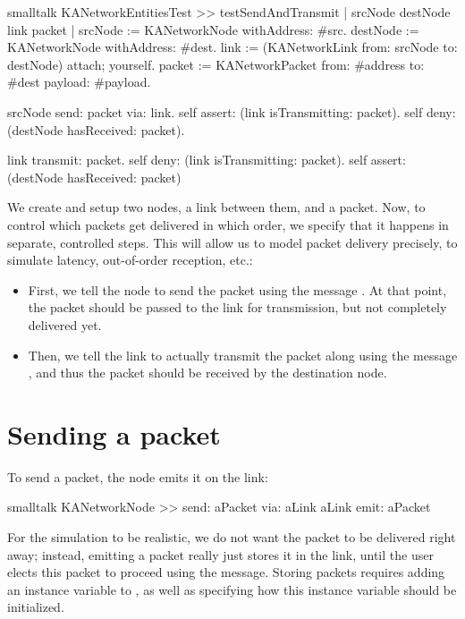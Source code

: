 \documentclass[10pt,twoside,english]{_support/latex/sbabook/sbabook}
\begin{document}
\begin{displaycode}{smalltalk}
KANetworkEntitiesTest >> testSendAndTransmit
    | srcNode destNode link packet |
    srcNode := KANetworkNode withAddress: #src.
    destNode := KANetworkNode withAddress: #dest.
    link := (KANetworkLink from: srcNode to: destNode) attach; yourself.
    packet := KANetworkPacket from: #address to: #dest payload: #payload.

    srcNode send: packet via: link.
    self assert: (link isTransmitting: packet).
    self deny: (destNode hasReceived: packet).

    link transmit: packet.
    self deny: (link isTransmitting: packet).
    self assert: (destNode hasReceived: packet)
\end{displaycode}

We create and setup two nodes, a link between them, and a packet.
Now, to control which packets get delivered in which order, we specify that it happens in separate, controlled steps.
This will allow us to model packet delivery precisely, to simulate latency, out-of-order reception, etc.:

\begin{itemize}
\item First, we tell the node to send the packet using the message . At that point, the packet should be passed to the link for transmission, but not completely delivered yet.
\item Then, we tell the link to actually transmit the packet along using the message , and thus the packet should be received by the destination node.
\end{itemize}
\section{Sending a packet}
To send a packet, the node emits it on the link:

\begin{displaycode}{smalltalk}
KANetworkNode >> send: aPacket via: aLink
    aLink emit: aPacket
\end{displaycode}

For the simulation to be realistic, we do not want the packet to be delivered right away; instead, emitting a packet really just stores it in the link, until the user elects this packet to proceed using the  message.
Storing packets requires adding an instance variable to , as well as specifying how this instance variable should be initialized.
\end{document}
